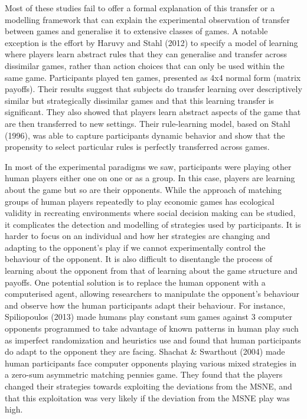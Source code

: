 \documentclass[man,floatsintext]{apa6}
\begin{document}
Most of these studies fail to offer a formal explanation of this transfer or a modelling framework that can explain the experimental observation of transfer between games and generalise it to extensive classes of games. A notable exception is the effort by Haruvy and Stahl (2012) to specify a model of learning where players learn abstract rules that they can generalise and transfer across dissimilar games, rather than action choices that can only be used within the same game. Participants played ten games, presented as 4x4 normal form (matrix payoffs). Their results suggest that subjects do transfer learning over descriptively similar but strategically dissimilar games and that this learning transfer is significant. They also showed that players learn abstract aspects of the game that are then transferred to new settings. Their rule-learning model, based on Stahl (1996), was able to capture participants dynamic behavior and show that the propensity to select particular rules is perfectly transferred across games.

In most of the experimental paradigms we saw, participants were playing other human players either one on one or as a group. In this case, players are learning about the game but so are their opponents. While the approach of matching groups of human players repeatedly to play economic games has ecological validity in recreating environments where social decision making can be studied, it complicates the detection and modelling of strategies used by participants. It is harder to focus on an individual and how her strategies are changing and adapting to the opponent's play if we cannot experimentally control the behaviour of the opponent. It is also difficult to disentangle the process of learning about the opponent from that of learning about the game structure and payoffs. One potential solution is to replace the human opponent with a computerised agent, allowing researchers to manipulate the opponent's behaviour and observe how the human participants adapt their behaviour. For instance, Spiliopoulos (2013) made humans play constant sum games against 3 computer opponents programmed to take advantage of known patterns in human play such as imperfect randomization and heuristics use and found that human participants do adapt to the opponent they are facing. Shachat \& Swarthout (2004) made human participants face computer opponents playing various mixed strategies in a zero-sum asymmetric matching pennies game. They found that the players changed their strategies towards exploiting the deviations from the MSNE, and that this exploitation was very likely if the deviation from the MSNE play was high.
\end{document}
